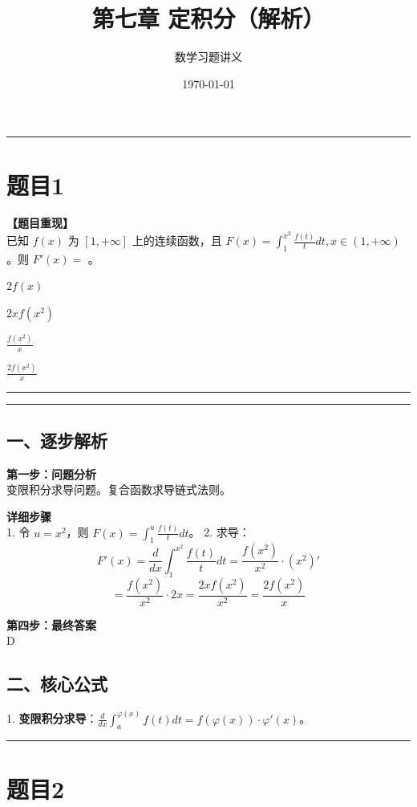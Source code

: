 \documentclass[12pt, a4paper]{ctexart}
\newcommand{\TopSeparator}{
    \par\noindent\rule{\textwidth}{1.5pt}\vspace{0.5em} %
}
\newcommand{\AnalysisSeparator}{
    \par\noindent\rule{\textwidth}{0.5pt}\vspace{0.2em}\hrule\vspace{0.5em} %
}
\newenvironment{RedAnalysis}{
    \par
    \color{red} %
}{
    \par
    \color{black} %
}
\newcommand{\choicesFour}[4]{
    \begin{enumerate}[label=\Alph*., itemsep=0pt, parsep=0pt, topsep=5pt, labelsep=0.5em]
        \begin{minipage}{0.22\linewidth} \item #1 \end{minipage}
        \begin{minipage}{0.22\linewidth} \item #2 \end{minipage}
        \begin{minipage}{0.22\linewidth} \item #3 \end{minipage}
        \begin{minipage}{0.22\linewidth} \item #4 \end{minipage}
    \end{enumerate}
}
\begin{document}
\title{\textbf{第七章 定积分（解析）}}
\author{数学习题讲义}
\date{\today}
\maketitle

\TopSeparator
\section*{题目1}

\textbf{【题目重现】} \\
已知 $ f(x) $ 为 $ [1, +\infty] $ 上的连续函数，且 $ F(x) = \int_{1}^{x^{2}} \frac{f(t)}{t} dt, x \in (1, +\infty) $ 。则 $ F'(x) = $ \underline{\hspace{1cm}}。
\choicesFour{$ 2f(x) $}{$ 2xf(x^{2}) $}{$ \frac{f(x^{2})}{x} $}{$ \frac{2f(x^{2})}{x} $}

\AnalysisSeparator

\begin{RedAnalysis}

\subsection*{一、逐步解析}

\textbf{第一步：问题分析} \\
变限积分求导问题。复合函数求导链式法则。

\textbf{详细步骤} \\
1. 令 $u = x^2$，则 $F(x) = \int_1^u \frac{f(t)}{t} dt$。
2. 求导：
   \[ F'(x) = \frac{d}{dx} \int_1^{x^2} \frac{f(t)}{t} dt = \frac{f(x^2)}{x^2} \cdot (x^2)' \]
   \[ = \frac{f(x^2)}{x^2} \cdot 2x = \frac{2x f(x^2)}{x^2} = \frac{2f(x^2)}{x} \]

\textbf{第四步：最终答案} \\
D

\subsection*{二、核心公式}
1. \textbf{变限积分求导}：$\frac{d}{dx} \int_a^{\varphi(x)} f(t) dt = f(\varphi(x)) \cdot \varphi'(x)$。

\end{RedAnalysis}

\vspace{2em}

\TopSeparator
\section*{题目2}
\end{document}
